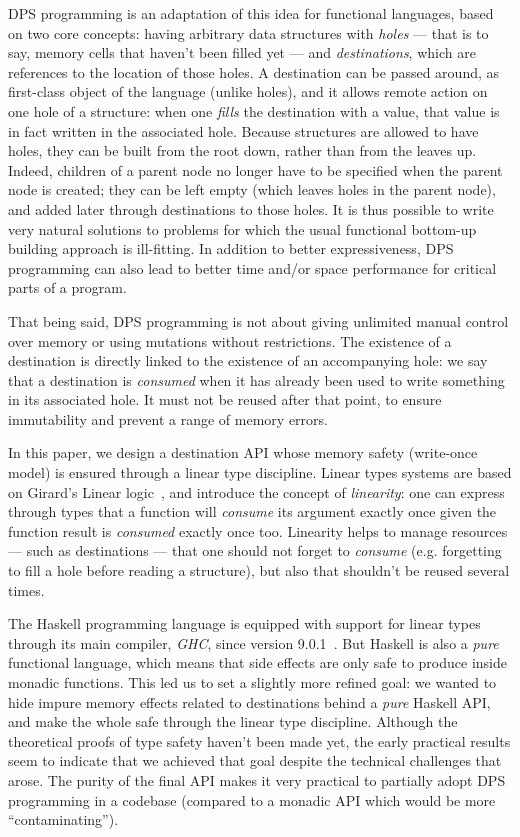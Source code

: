 \documentclass[english]{jflart}
\begin{document}
DPS programming is an adaptation of this idea for functional languages, based on two core concepts: having arbitrary data structures with \emph{holes} --- that is to say, memory cells that haven't been filled yet --- and \emph{destinations}, which are references to the location of those holes. A destination can be passed around, as first-class object of the language (unlike holes), and it allows remote action on one hole of a structure: when one \emph{fills} the destination with a value, that value is in fact written in the associated hole. Because structures are allowed to have holes, they can be built from the root down, rather than from the leaves up. Indeed, children of a parent node no longer have to be specified when the parent node is created; they can be left empty (which leaves holes in the parent node), and added later through destinations to those holes. It is thus possible to write very natural solutions to problems for which the usual functional bottom-up building approach is ill-fitting. In addition to better expressiveness, DPS programming can also lead to better time and/or space performance for critical parts of a program.

That being said, DPS programming is not about giving unlimited manual control over memory or using mutations without restrictions. The existence of a destination is directly linked to the existence of an accompanying hole: we say that a destination is \emph{consumed} when it has already been used to write something in its associated hole. It must not be reused after that point, to ensure immutability and prevent a range of memory errors.

In this paper, we design a destination API whose memory safety (write-once model) is ensured through a linear type discipline. Linear types systems are based on Girard's Linear logic~\cite{girard_linear_1995}, and introduce the concept of \emph{linearity}: one can express through types that a function will \emph{consume} its argument exactly once given the function result is \emph{consumed} exactly once too. Linearity helps to manage resources --- such as destinations --- that one should not forget to \emph{consume} (e.g. forgetting to fill a hole before reading a structure), but also that shouldn't be reused several times.

The Haskell programming language is equipped with support for linear types through its main compiler, \emph{GHC}, since version 9.0.1~\cite{bernardy_linear_2018}. But Haskell is also a \emph{pure} functional language, which means that side effects are only safe to produce inside monadic functions. This led us to set a slightly more refined goal: we wanted to hide impure memory effects related to destinations behind a \emph{pure} Haskell API, and make the whole safe through the linear type discipline. Although the theoretical proofs of type safety haven't been made yet, the early practical results seem to indicate that we achieved that goal despite the technical challenges that arose. The purity of the final API makes it very practical to partially adopt DPS programming in a codebase (compared to a monadic API which would be more ``contaminating'').
\end{document}
